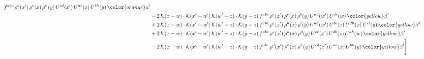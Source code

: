 \begin{align}
f^{abc}\,\rho^{d}(x')\,\rho^{e}(x)\,\rho^{h}(y)\, U^{cd}(x')\,U^{ae}(x)\,U^{bh}(y)\, {\color{orange} \alpha'}\notag \\ & -2\, \mathcal{K}(x-w)\cdot \mathcal{K}(x'-w')\, \mathcal{K}(w'-z)\cdot \mathcal{K}(y-z)\, f^{abc}\,\rho^{c}(x')\,\rho^{e}(x)\,\rho^{b}(y)\,U^{ad}(w')\,U^{de}(w)\, {\color{yellow} \beta'}\notag \\ & +2\, \mathcal{K}(x-w)\cdot \mathcal{K}(x'-w')\, \mathcal{K}(w'-z)\cdot \mathcal{K}(y-z)\, f^{abc}\,\rho^{c}(x')\,\rho^{h}(x)\,\rho^{l}(y)\,U^{ad}(w')\,U^{be}(z)\,U^{dh}(x)\,U^{el}(y)\, {\color{yellow} \beta'}\notag \\ & +2\, \mathcal{K}(x-w)\cdot \mathcal{K}(x'-w')\, \mathcal{K}(w'-z)\cdot \mathcal{K}(y-z)\, f^{abc}\,\rho^{e}(x')\,\rho^{h}(x)\,\rho^{d}(y)\,U^{ce}(x')\,U^{db}(z)\,U^{ah}(w)\, {\color{yellow} \beta'}\notag \\ &  -2\, \mathcal{K}(x-w)\cdot \mathcal{K}(x'-w')\, \mathcal{K}(w'-z)\cdot \mathcal{K}(y-z)\, f^{abc}\,\rho^{d}(x')\,\rho^{e}(x)\,\rho^{h}(y)\,U^{cd}(x')\,U^{ae}(x)\,U^{bh}(y)\, {\color{yellow} \beta'}\Bigg]
\end{align}

